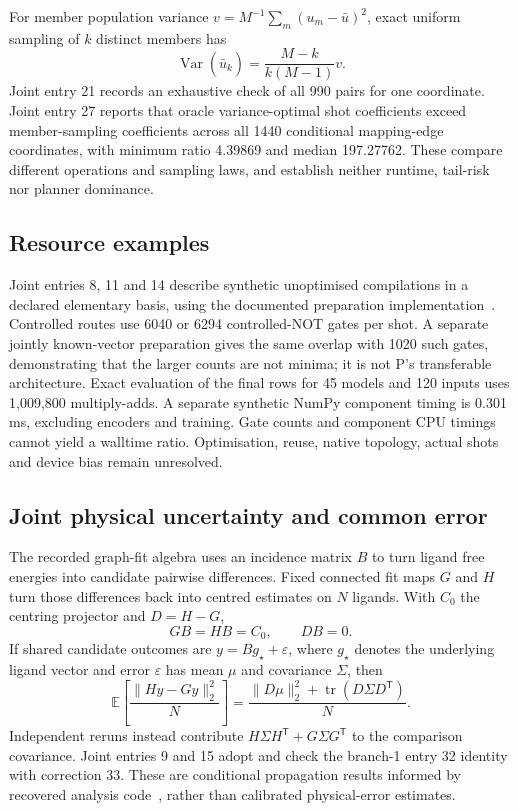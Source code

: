 \documentclass{article}
\begin{document}
For member population variance \(v=M^{-1}\sum_m(u_m-\bar u)^2\), exact uniform sampling of \(k\) distinct members has
\[
\operatorname{Var}(\widehat{\bar u}_k)=\frac{M-k}{k(M-1)}v.
\]
Joint entry 21 records an exhaustive check of all 990 pairs for one coordinate. Joint entry 27 reports that oracle variance-optimal shot coefficients exceed member-sampling coefficients across all 1440 conditional mapping-edge coordinates, with minimum ratio 4.39869 and median 197.27762. These compare different operations and sampling laws, and establish neither runtime, tail-risk nor planner dominance.

\subsection{Resource examples}

Joint entries 8, 11 and 14 describe synthetic unoptimised compilations in a declared elementary basis, using the documented preparation implementation~\cite{preparation}. Controlled routes use 6040 or 6294 controlled-NOT gates per shot. A separate jointly known-vector preparation gives the same overlap with 1020 such gates, demonstrating that the larger counts are not minima; it is not P's transferable architecture. Exact evaluation of the final rows for 45 models and 120 inputs uses 1,009,800 multiply-adds. A separate synthetic NumPy component timing is 0.301 ms, excluding encoders and training. Gate counts and component CPU timings cannot yield a walltime ratio. Optimisation, reuse, native topology, actual shots and device bias remain unresolved.

\subsection{Joint physical uncertainty and common error}

The recorded graph-fit algebra uses an incidence matrix \(B\) to turn ligand free energies into candidate pairwise differences. Fixed connected fit maps \(G\) and \(H\) turn those differences back into centred estimates on \(N\) ligands. With \(C_0\) the centring projector and \(D=H-G\),
\[
GB=HB=C_0,\qquad DB=0.
\]
If shared candidate outcomes are \(y=Bg_\star+\varepsilon\), where \(g_\star\) denotes the underlying ligand vector and error \(\varepsilon\) has mean \(\mu\) and covariance \(\Sigma\), then
\[
\mathbb E\!\left[\frac{\|Hy-Gy\|_2^2}{N}\right]
=\frac{\|D\mu\|_2^2+\operatorname{tr}(D\Sigma D^{\mathsf T})}{N}.
\]
Independent reruns instead contribute \(H\Sigma H^{\mathsf T}+G\Sigma G^{\mathsf T}\) to the comparison covariance. Joint entries 9 and 15 adopt and check the branch-1 entry 32 identity with correction 33. These are conditional propagation results informed by recovered analysis code~\cite{analysis}, rather than calibrated physical-error estimates.
\end{document}
